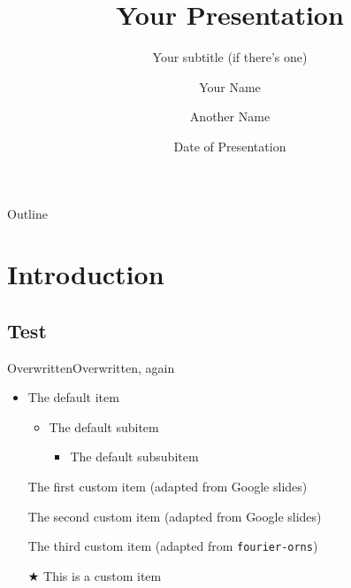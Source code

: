 \documentclass[
  10pt,
  aspectratio=169,
  xcolor={dvipsnames,table,x11names},  %
]{beamer}
\title[Your Short Title]{Your Presentation}
\subtitle{Your subtitle (if there's one)}
\author[\MakeUppercase{Your name (short)}]{Your Name \and Another Name}  %
\institute{Your Faculty/Department}
\date{Date of Presentation}
\begin{document}
{  %
\begin{frame}  %
  \vspace*{-\baselineskip}%
  \titlepage
\end{frame}
}


\begin{frame}{Outline}
  \hypersetup{linkcolor=black}
  \tableofcontents[sectionstyle=shaded/show, hideallsubsections]
\end{frame}



\section{Introduction}
  \subsection{Test}

\begin{frame}{Overwritten}{Overwritten, again}

  \begin{itemize}
    \item The default item
    \begin{itemize}
      \item The default subitem
      
      \begin{itemize}
        \item The default subsubitem
      \end{itemize}
    \end{itemize}
    \item[\GWthemeRotatedsquareItem] The first custom item (adapted from Google slides)
    
    \item[\GWthemeShiftedsquareItem] The second custom item (adapted from Google slides)
    
    \item[\GWthemeStarredbullet] The third custom item (adapted from \texttt{fourier-orns})
    
    \item[$\bigstar$] This is a custom item
  \end{itemize}

\end{frame}
\end{document}
